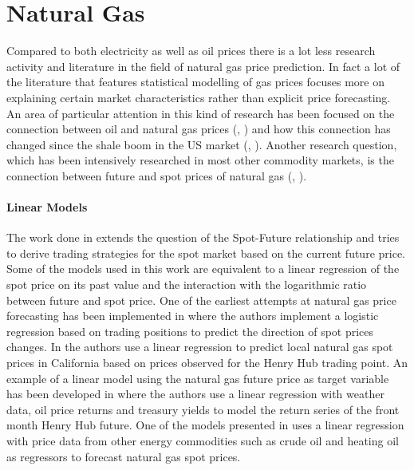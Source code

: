 \section{Natural Gas}
Compared to both electricity as well as oil prices there is a lot less research activity and literature in the field of natural gas price prediction. In fact a lot of the literature that features statistical modelling of gas prices focuses more on explaining certain market characteristics rather than explicit price forecasting. An area of particular attention in this kind of research has been focused on the connection between oil and natural gas prices (\cite{villar_relationship_2006}, \cite{hartley_relationship_2008}) and how this connection has changed since the shale boom in the US market (\cite{geng_how_2016}, \cite{caporin_long-run_2017}). Another research question, which has been intensively researched in most other commodity markets, is the connection between future and spot prices of natural gas (\cite{herbert_relation_1993}, \cite{chinn_predictive_2014}).

\paragraph{Linear Models}
The work done in \cite{mishra_are_2016} extends the question of the Spot-Future relationship and tries to derive trading strategies for the spot market based on the current future price. Some of the models used in this work are equivalent to a linear regression of the spot price on its past value and the interaction with the logarithmic ratio between future and spot price. One of the earliest attempts at natural gas price forecasting has been implemented in 
\cite{buchanan_which_2001} where the authors implement a logistic regression based on trading positions to predict the direction of spot prices changes.
In \cite{woo_market_2006} the authors use a linear regression to predict local natural gas spot prices in California based on prices observed for the Henry Hub trading point. An example of a linear model using the natural gas future price as target variable has been developed in \cite{mu_weather_2007} where the authors use a linear regression with weather data, oil price returns and treasury yields to model the return series of the front month Henry Hub future. One of the models presented in \cite{malliaris_forecasting_2008} uses a linear regression with price data from other energy commodities such as crude oil and heating oil as regressors to forecast natural gas spot prices. 

